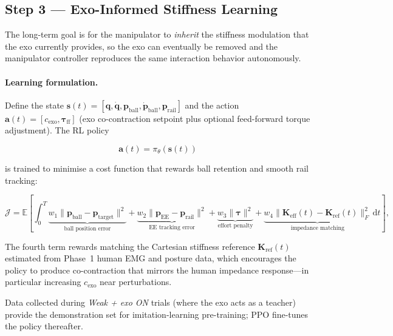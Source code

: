 \documentclass[11pt, a4paper]{article}
\newcommand{\bq}{\bm{q}}
\newcommand{\btau}{\bm{\tau}}
\begin{document}
\subsection{Step 3 --- Exo-Informed Stiffness Learning}

The long-term goal is for the manipulator to \emph{inherit} the stiffness
modulation that the exo currently provides, so the exo can eventually be
removed and the manipulator controller reproduces the same interaction
behavior autonomously.

\paragraph{Learning formulation.}
Define the state $\bm{s}(t) = [\bq, \dot{\bq},
\bm{p}_{\text{ball}}, \dot{\bm{p}}_{\text{ball}}, \bm{p}_{\text{rail}}]$
and the action $\bm{a}(t) = [c_{\text{exo}}, \btau_{\text{ff}}]$ (exo
co-contraction setpoint plus optional feed-forward torque adjustment).  The
RL policy

\[
  \bm{a}(t) = \pi_\theta(\bm{s}(t))
\]

is trained to minimise a cost function that rewards ball retention and
smooth rail tracking:

\begin{equation}
  \mathcal{J} = \mathbb{E}\!\left[\int_0^T
    \underbrace{w_1 \|\bm{p}_{\text{ball}} - \bm{p}_{\text{target}}\|^2}_{
        \text{ball position error}}
    + \underbrace{w_2 \|\bm{p}_{\text{EE}} - \bm{p}_{\text{rail}}\|^2}_{
        \text{EE tracking error}}
    + \underbrace{w_3 \|\btau\|^2}_{
        \text{effort penalty}}
    + \underbrace{w_4 \|\mathbf{K}_{\text{eff}}(t) - \mathbf{K}_{\text{ref}}(t)\|_F^2}_{
        \text{impedance matching}}
    \,\mathrm{d}t\right],
\end{equation}

The fourth term rewards matching the Cartesian stiffness reference
$\mathbf{K}_{\text{ref}}(t)$ estimated from Phase~1 human EMG and posture
data, which encourages the policy to produce co-contraction that mirrors the
human impedance response---in particular increasing $c_{\text{exo}}$ near
perturbations.

Data collected during \emph{Weak + exo ON} trials (where the exo acts as a
teacher) provide the demonstration set for imitation-learning pre-training;
PPO fine-tunes the policy thereafter.
\end{document}
